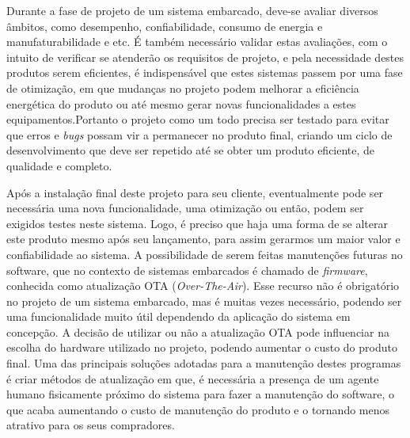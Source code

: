 

Durante a fase de projeto de um sistema embarcado, deve-se avaliar diversos âmbitos, como desempenho, confiabilidade, consumo de energia e manufaturabilidade e etc. É também necessário validar estas avaliações, com o intuito de verificar se atenderão os requisitos de projeto, e pela necessidade destes produtos serem eficientes, é indispensável que estes sistemas passem por uma fase de otimização, em que mudanças no projeto podem melhorar a eficiência energética do produto ou até mesmo gerar novas funcionalidades a estes equipamentos.Portanto o projeto como um todo precisa ser testado para evitar que erros e \textit{bugs} possam vir a permanecer no produto final\cite{Marwedel2006}, criando um ciclo de desenvolvimento que deve ser repetido até se obter um produto eficiente, de qualidade e completo.

Após a instalação final deste projeto para seu cliente, eventualmente pode ser necessária uma nova funcionalidade, uma otimização ou então, podem ser exigidos testes neste sistema. Logo, é preciso que haja uma forma de se alterar este produto mesmo após seu lançamento, para assim gerarmos um maior valor e confiabilidade ao sistema.
A possibilidade de serem feitas manutenções futuras no software, que no contexto de sistemas embarcados é chamado de \textit{firmware}, conhecida como atualização OTA (\textit{Over-The-Air}). Esse recurso não é obrigatório no projeto de um sistema embarcado, mas é muitas vezes necessário, podendo ser uma funcionalidade muito útil dependendo da aplicação do sistema em concepção. A decisão de utilizar ou não a atualização OTA pode influenciar na escolha do hardware utilizado no projeto\cite{Ball2002}, 
podendo aumentar o custo do produto final.
Uma das principais soluções adotadas para a manutenção destes programas é criar métodos de atualização em que, é necessária a presença de um agente humano fisicamente próximo do sistema para fazer a manutenção do software, o que acaba aumentando o custo de manutenção do produto e o tornando menos atrativo para os seus compradores.

